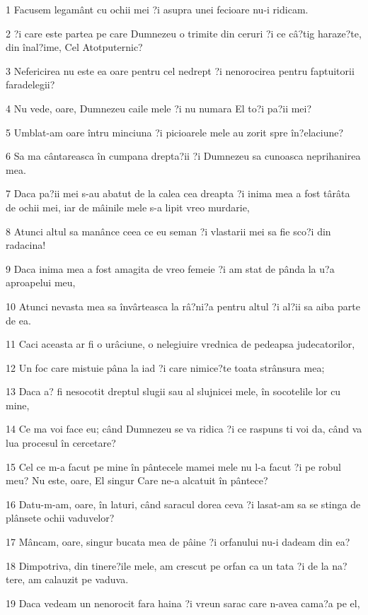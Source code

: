 \par 1 Facusem legamânt cu ochii mei ?i asupra unei fecioare nu-i ridicam.
\par 2 ?i care este partea pe care Dumnezeu o trimite din ceruri ?i ce câ?tig haraze?te, din înal?ime, Cel Atotputernic?
\par 3 Nefericirea nu este ea oare pentru cel nedrept ?i nenorocirea pentru faptuitorii faradelegii?
\par 4 Nu vede, oare, Dumnezeu caile mele ?i nu numara El to?i pa?ii mei?
\par 5 Umblat-am oare întru minciuna ?i picioarele mele au zorit spre în?elaciune?
\par 6 Sa ma cântareasca în cumpana drepta?ii ?i Dumnezeu sa cunoasca neprihanirea mea.
\par 7 Daca pa?ii mei s-au abatut de la calea cea dreapta ?i inima mea a fost târâta de ochii mei, iar de mâinile mele s-a lipit vreo murdarie,
\par 8 Atunci altul sa manânce ceea ce eu seman ?i vlastarii mei sa fie sco?i din radacina!
\par 9 Daca inima mea a fost amagita de vreo femeie ?i am stat de pânda la u?a aproapelui meu,
\par 10 Atunci nevasta mea sa învârteasca la râ?ni?a pentru altul ?i al?ii sa aiba parte de ea.
\par 11 Caci aceasta ar fi o urâciune, o nelegiuire vrednica de pedeapsa judecatorilor,
\par 12 Un foc care mistuie pâna la iad ?i care nimice?te toata strânsura mea;
\par 13 Daca a? fi nesocotit dreptul slugii sau al slujnicei mele, în socotelile lor cu mine,
\par 14 Ce ma voi face eu; când Dumnezeu se va ridica ?i ce raspuns ti voi da, când va lua procesul în cercetare?
\par 15 Cel ce m-a facut pe mine în pântecele mamei mele nu l-a facut ?i pe robul meu? Nu este, oare, El singur Care ne-a alcatuit în pântece?
\par 16 Datu-m-am, oare, în laturi, când saracul dorea ceva ?i lasat-am sa se stinga de plânsete ochii vaduvelor?
\par 17 Mâncam, oare, singur bucata mea de pâine ?i orfanului nu-i dadeam din ea?
\par 18 Dimpotriva, din tinere?ile mele, am crescut pe orfan ca un tata ?i de la na?tere, am calauzit pe vaduva.
\par 19 Daca vedeam un nenorocit fara haina ?i vreun sarac care n-avea cama?a pe el,

